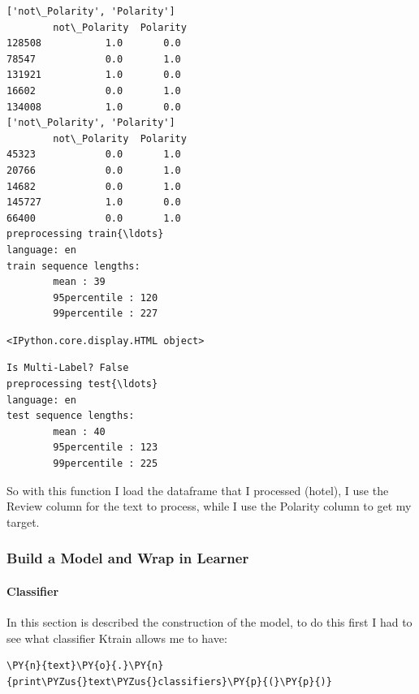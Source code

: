 \begin{Verbatim}[commandchars=\\\{\},fontsize=\footnotesize]
['not\_Polarity', 'Polarity']
        not\_Polarity  Polarity
128508           1.0       0.0
78547            0.0       1.0
131921           1.0       0.0
16602            0.0       1.0
134008           1.0       0.0
['not\_Polarity', 'Polarity']
        not\_Polarity  Polarity
45323            0.0       1.0
20766            0.0       1.0
14682            0.0       1.0
145727           1.0       0.0
66400            0.0       1.0
preprocessing train{\ldots}
language: en
train sequence lengths:
        mean : 39
        95percentile : 120
        99percentile : 227
    \end{Verbatim}

    
    \begin{Verbatim}[commandchars=\\\{\},fontsize=\footnotesize]
<IPython.core.display.HTML object>
    \end{Verbatim}

    
    \begin{Verbatim}[commandchars=\\\{\},fontsize=\footnotesize]
Is Multi-Label? False
preprocessing test{\ldots}
language: en
test sequence lengths:
        mean : 40
        95percentile : 123
        99percentile : 225
    \end{Verbatim}
So with this function I load the dataframe that I processed (hotel), I use the Review column for the text to process, while I use the Polarity column to get my target.


\subsubsection{Build a Model and Wrap in Learner}
\paragraph{Classifier}
In this section is described the construction of the model, to do this first I had to see what classifier \gls{Ktrain} allows me to have:
    \begin{tcolorbox}[breakable, size=fbox, boxrule=1pt, pad at break*=1mm,colback=cellbackground, colframe=cellborder]
\begin{Verbatim}[commandchars=\\\{\},fontsize=\footnotesize]
\PY{n}{text}\PY{o}{.}\PY{n}{print\PYZus{}text\PYZus{}classifiers}\PY{p}{(}\PY{p}{)}
\end{Verbatim}
\end{tcolorbox}

